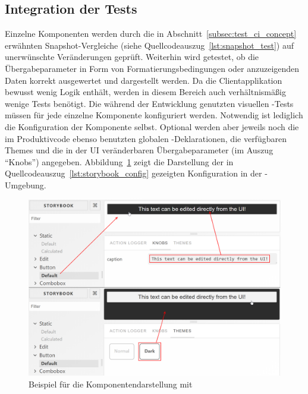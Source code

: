 \subsection{Integration der Tests}
Einzelne Komponenten werden durch die in Abschnitt~\ref{subsec:test_ci_concept} erwähnten Snapshot-Vergleiche (siehe Quellcodeauszug~\ref{lst:snapshot_test}) auf unerwünschte Veränderungen geprüft. Weiterhin wird getestet, ob die Übergabeparameter in Form von Formatierungsbedingungen oder anzuzeigenden Daten korrekt ausgewertet und dargestellt werden. Da die Clientapplikation bewusst wenig Logik enthält, werden in diesem Bereich auch verhältnismäßig wenige Tests benötigt.
Die während der Entwicklung genutzten visuellen -Tests müssen für jede einzelne Komponente konfiguriert werden. Notwendig ist lediglich die Konfiguration der Komponente selbst. Optional werden aber jeweils noch die im Produktivcode ebenso benutzten globalen -Deklarationen, die verfügbaren Themes und die in der UI veränderbaren Übergabeparameter (im Auszug \enquote{Knobs}) angegeben. Abbildung~\ref{fig:storybook_example} zeigt die Darstellung der in Quellcodeauszug~\ref{lst:storybook_config} gezeigten Konfiguration in der -Umgebung.





\begin{figure}
    \centering
    \captionsetup{justification=centering}
    \includegraphics[width=\textwidth]{figures/storybook_example.png}
        \caption{Beispiel für die Komponentendarstellung mit }\label{fig:storybook_example}
\end{figure}

